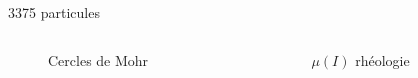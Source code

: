 \documentclass[10pt]{beamer}
\begin{document}
\begin{frame}{3375 particules}
    \begin{columns}
        \begin{column}{0.5\textwidth}
            \begin{figure}[h]
                \centering
                \scalebox{0.4}{}
                \caption{Cercles de Mohr}
            \end{figure}
        \end{column}
        \begin{column}{0.5\textwidth}
            \begin{figure}[h]
                \centering
                \scalebox{0.5}{}
                \caption{$\mu(I)$ rhéologie}
            \end{figure}
        \end{column}
    \end{columns}
\end{frame}
\end{document}
